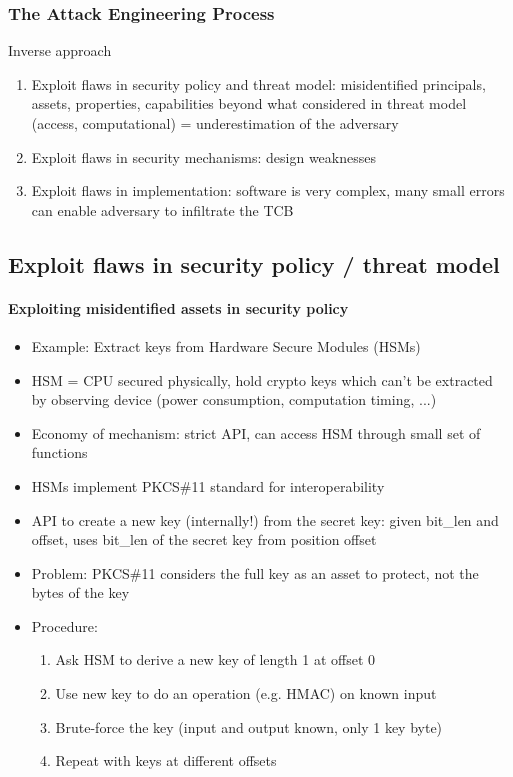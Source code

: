 \documentclass{article}
\newenvironment{myitemize}
{ \begin{itemize}
    \setlength{\itemsep}{005pt}
    \setlength{\parskip}{0pt}
    \setlength{\parsep}{0pt}     }
{ \end{itemize}                  }
\begin{document}
\begin{multicols}{2}
\subsubsection{The Attack Engineering Process}

Inverse approach

\begin{enumerate}
    \item Exploit flaws in security policy and threat model: misidentified principals, assets, properties, capabilities beyond what considered in threat model (access, computational) = underestimation of the adversary
    \item Exploit flaws in security mechanisms: design weaknesses
    \item Exploit flaws in implementation: software is very complex, many small errors can enable adversary to infiltrate the TCB
\end{enumerate}


\subsection{Exploit flaws in security policy / threat model}

\paragraph{Exploiting misidentified assets in security policy}

\begin{myitemize}
    \item Example: Extract keys from Hardware Secure Modules (HSMs)
    \item HSM = CPU secured physically, hold crypto keys which can't be extracted by observing device (power consumption, computation timing, ...)
    \item Economy of mechanism: strict API, can access HSM through small set of functions
    \item HSMs implement PKCS\#11 standard for interoperability
    \item API to create a new key (internally!) from the secret key: given bit\_len and offset, uses bit\_len of the secret key from position offset
    \item Problem: PKCS\#11 considers the full key as an asset to protect, not the bytes of the key
    \item Procedure:
    \begin{enumerate}
        \item Ask  HSM to derive a new key of length 1 at offset 0
        \item Use new key to do an operation (e.g. HMAC) on known input
        \item Brute-force the key (input and output known, only 1 key byte)
        \item Repeat with keys at different offsets
    \end{enumerate}
\end{myitemize}



\end{multicols}
\end{document}
